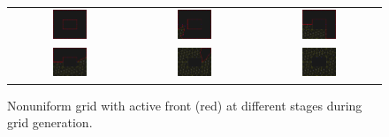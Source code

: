 \documentclass[11pt]{article}
\begin{document}
\begin{figure}[htbp] 
\begin{center}
\begin{tabular}{ccc}
\includegraphics[width = 0.30\textwidth]{front_0.png} & \includegraphics[width = 0.30\textwidth]{front_1b.png} & \includegraphics[width = 0.30\textwidth]{front_2b.png} \\
\includegraphics[width = 0.30\textwidth]{front_3b.png} & \includegraphics[width = 0.30\textwidth]{front_4b.png} &\includegraphics[width = 0.30\textwidth]{front_5b.png} \\
\end{tabular}
\caption{Nonuniform grid  with active front (red) at different stages during grid generation.}
\label{fig_gridb}
\end{center}
\end{figure}
\end{document}
